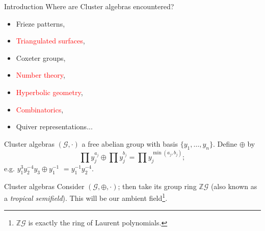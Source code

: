 \documentclass{beamer}
\begin{document}
\begin{frame}{Introduction}
    Where are Cluster algebras encountered?
    \begin{itemize}
        \item Frieze patterns,
        \item \textcolor{red}{Triangulated surfaces},
        \item Coxeter groups,
        \item \textcolor{red}{Number theory},
        \item \textcolor{red}{Hyperbolic geometry},
        \item \textcolor{red}{Combinatorics},
        \item Quiver representations...
    \end{itemize}
\end{frame}

\begin{frame}{Cluster algebras}
    $(\mathcal{G}, \cdot)$ a free abelian group with basis $\{y_1,\dots,y_n\}$.
    \pause
    Define $\oplus$ by 
    \begin{equation*}
        \prod y_j^{a_j}\oplus\prod y_j^{b_j} = \prod y_j^{\min(a_j,b_j)};
    \end{equation*}
    \pause
    e.g. $y_1^3y_2^{-4}y_3\oplus y_1^{-1}$ $= y_1^{-1}y_2^{-4}$.
\end{frame}
    
\begin{frame}{Cluster algebras}
    Consider $(\mathcal{G}, \oplus, \cdot)$; \pause  then take its group ring $\mathbb{Z}\mathcal{G}$ (also known as a \emph{tropical semifield}). This will be our ambient field\footnote{$\mathbb{Z}\mathcal{G}$ is exactly the ring of Laurent polynomials.}.
\end{frame}

    
\end{document}
